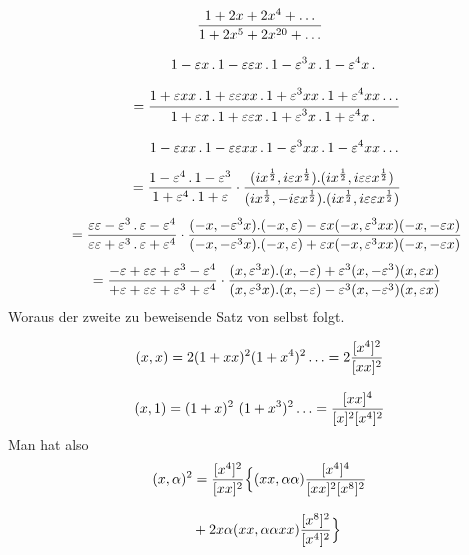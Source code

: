 \[
\begin{gathered}
\frac{1+2x+2x^4+\mathinner{.\,.\,.}}{1+2x^5+2x^{20}+\mathinner{.\,.\,.}}\\[8pt]
\quad=\dfrac{\begin{gathered}1-\varepsilon x\,.\,1-\varepsilon\varepsilon x\,.\,1-\varepsilon^3x\,.\,1-\varepsilon^4x\,.\,\\[6pt]1+\varepsilon xx\,.\,1+\varepsilon\varepsilon xx\,.\,1+\varepsilon^3xx\,.\,1+\varepsilon^4xx\mathinner{.\,.\,.}\end{gathered}}
 {\begin{gathered}1+\varepsilon x\,.\,1+\varepsilon\varepsilon x\,.\,1+\varepsilon^3x\,.\,1+\varepsilon^4x\,.\,\\[6pt]1-\varepsilon xx\,.\,1-\varepsilon\varepsilon xx\,.\,1-\varepsilon^3xx\,.\,1-\varepsilon^4xx\mathinner{.\,.\,.}\end{gathered}}\\[1ex]
\quad=\frac{1-\varepsilon^4\,.\,1-\varepsilon^3}{1+\varepsilon^4\,.\,1+\varepsilon}
 \cdot\frac{(ix^{\frac12},i\varepsilon x^{\frac12}).(ix^{\frac12},i\varepsilon\varepsilon x^{\frac12})}
 {(ix^{\frac12},-i\varepsilon x^{\frac12}).(ix^{\frac12},i\varepsilon\varepsilon x^{\frac12})}\\[1ex]
\quad=\frac{\varepsilon\varepsilon-\varepsilon^3\,.\,\varepsilon-\varepsilon^4}
 {\varepsilon\varepsilon+\varepsilon^3\,.\,\varepsilon+\varepsilon^4}
 \cdot\frac{(-x,-\varepsilon^3x).(-x,\varepsilon)-\varepsilon x(-x,\varepsilon^3xx)(-x,-\varepsilon x)}
 {(-x,-\varepsilon^3x).(-x,\varepsilon)+\varepsilon x(-x,\varepsilon^3xx)(-x,-\varepsilon x)}\\[1ex]
\quad=\frac{-\varepsilon+\varepsilon\varepsilon+\varepsilon^3-\varepsilon^4}
 {+\varepsilon+\varepsilon\varepsilon+\varepsilon^3+\varepsilon^4}
 \cdot\frac{(x,\varepsilon^3x).(x,-\varepsilon)+\varepsilon^3(x,-\varepsilon^3)(x,\varepsilon x)}
 {(x,\varepsilon^3x).(x,-\varepsilon)-\varepsilon^3(x,-\varepsilon^3)(x,\varepsilon x)}
\end{gathered}
\]
Woraus der zweite zu beweisende Satz von selbst folgt.


\[
\begin{gathered}
(x,x)=2(1+xx)^2(1+x^4)^2\mathinner{.\,.\,.}
       =2\frac{[x^4]^2}{[xx]^2}\\[8pt]
(x,1)=(1+x)^2\ (1+x^3)^2\mathinner{.\,.\,.}
       =\frac{[xx]^4}{[x]^2[x^4]^2}
\end{gathered}
\]
Man hat also
\[
\begin{gathered}(x,\alpha)^2=\frac{[x^4]^2}{[xx]^2}
\Bigl\{(xx,\alpha\alpha)\frac{[x^4]^4}{[xx]^2[x^8]^2}
\\[8pt]\quad{}+2x\alpha(xx,\alpha\alpha xx)\frac{[x^8]^2}{[x^4]^2}\Bigr\}\end{gathered}
\]

